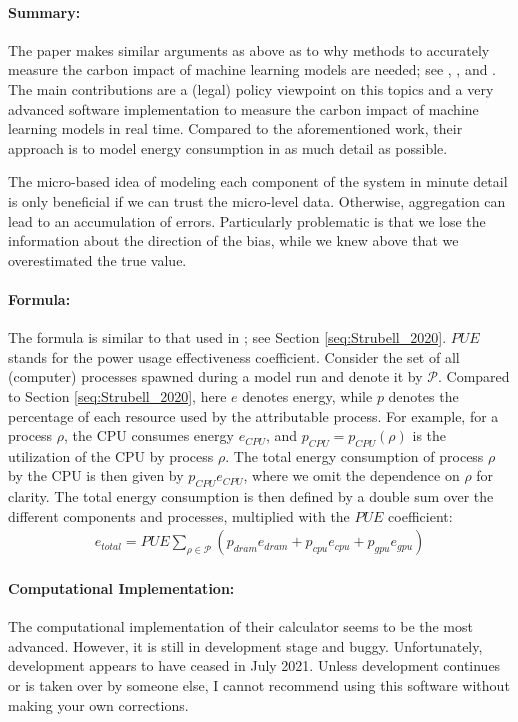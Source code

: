\documentclass[a4paper, 12pt]{article}
\begin{document}
\paragraph{Summary:} The paper makes similar arguments as above as to why methods to
accurately measure the carbon impact of machine learning models are needed; see
, , and . The main
contributions are a (legal) policy viewpoint on this topics and a very advanced software
implementation to measure the carbon impact of machine learning models in real time.
Compared to the aforementioned work, their approach is to model energy consumption in as
much detail as possible.

The micro-based idea of modeling each component of the system in minute detail is only
beneficial if we can trust the micro-level data. Otherwise, aggregation can lead to an
accumulation of errors. Particularly problematic is that we lose the information about
the direction of the bias, while we knew above that we overestimated the true value.

\paragraph{Formula:} The formula is similar to that used in ; see
Section \ref{seq:Strubell_2020}. $PUE$ stands for the power usage effectiveness
coefficient. Consider the set of all (computer) processes spawned during a model run and
denote it by $\mathcal{P}$. Compared to Section \ref{seq:Strubell_2020}, here $e$
denotes energy, while $p$ denotes the percentage of each resource used by the
attributable process. For example, for a process $\rho$, the CPU consumes energy
$e_{CPU}$, and $p_{CPU} = p_{CPU}(\rho)$ is the utilization of the CPU by process
$\rho$. The total energy consumption of process $\rho$ by the CPU is then given by
$p_{CPU} e_{CPU}$, where we omit the dependence on $\rho$ for clarity. The total energy
consumption is then defined by a double sum over the different components and processes,
multiplied with the $PUE$ coefficient:
\begin{align}
    e_{total} = PUE \sum_{\rho \in \mathcal{P}} (p_{dram} e_{dram} + p_{cpu} e_{cpu} +
    p_{gpu} e_{gpu})
\end{align}

\paragraph{Computational Implementation:} The computational implementation of their
calculator seems to be the most advanced. However, it is still in development stage and
buggy. Unfortunately, development appears to have ceased in July 2021. Unless
development continues or is taken over by someone else, I cannot recommend using this
software without making your own corrections.
\end{document}
